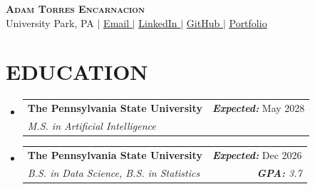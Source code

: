 \documentclass[letterpaper,11pt]{article}
\makeatletter
\newcommand{\resumeSubheading}[4]{
  \item
    \begin{tabular*}{0.97\textwidth}[t]{l@{\extracolsep{\fill}}r}
      \textbf{#1} & #2 \\
      \textit{\small#3} & \textit{\small #4} \\
    \end{tabular*}\vspace{-7pt}
}
\newcommand{\resumeSubHeadingListStart}{\begin{itemize}[leftmargin=0.15in, label={}]}
\newcommand{\resumeSubHeadingListEnd}{\end{itemize}}
\makeatother
\begin{document}
\begin{center}
    \textbf{\Huge \scshape Adam Torres Encarnacion} \\ \vspace{1pt}
    \small University Park, PA $|$ \href{mailto:art5809@psu.edu}{\underline{Email \faEnvelope}} $|$
    \href{https://www.linkedin.com/in/adam-torres-encarnacion/}{\underline{LinkedIn \faLinkedin}} $|$
    \href{https://github.com/0xABAN}{\underline{GitHub \faGithub}} $|$
    \href{https://advm.dev/}{\underline{Portfolio \raisebox{-0.0625em}{\resizebox{0.875em}{0.875em}{$\blacktriangle$}}}}
\end{center}


\section{\textbf{EDUCATION}}
  \resumeSubHeadingListStart
    \resumeSubheading
    {The Pennsylvania State University}{\textbf{\textit{Expected:}} May 2028}
      {M.S. in Artificial Intelligence}{}
    \resumeSubheading
    {The Pennsylvania State University}{\textbf{\textit{Expected:}} Dec 2026}
      {B.S. in Data Science, B.S. in Statistics}{\textbf{\textit{GPA:}} 3.7}
  \resumeSubHeadingListEnd

\end{document}
